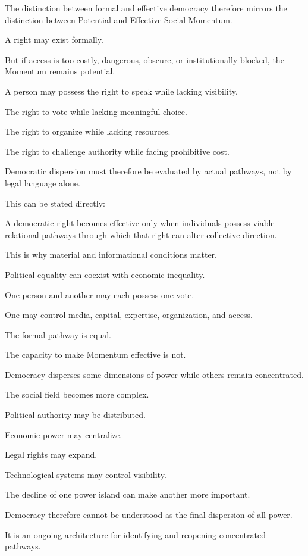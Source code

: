 The distinction between formal and effective democracy therefore mirrors the distinction between Potential and Effective Social Momentum.

A right may exist formally.

But if access is too costly, dangerous, obscure, or institutionally blocked, the Momentum remains potential.

A person may possess the right to speak while lacking visibility.

The right to vote while lacking meaningful choice.

The right to organize while lacking resources.

The right to challenge authority while facing prohibitive cost.

Democratic dispersion must therefore be evaluated by actual pathways, not by legal language alone.

This can be stated directly:

A democratic right becomes effective only when individuals possess viable relational pathways through which that right can alter collective direction.

This is why material and informational conditions matter.

Political equality can coexist with economic inequality.

One person and another may each possess one vote.

One may control media, capital, expertise, organization, and access.

The formal pathway is equal.

The capacity to make Momentum effective is not.

Democracy disperses some dimensions of power while others remain concentrated.

The social field becomes more complex.

Political authority may be distributed.

Economic power may centralize.

Legal rights may expand.

Technological systems may control visibility.

The decline of one power island can make another more important.

Democracy therefore cannot be understood as the final dispersion of all power.

It is an ongoing architecture for identifying and reopening concentrated pathways.


